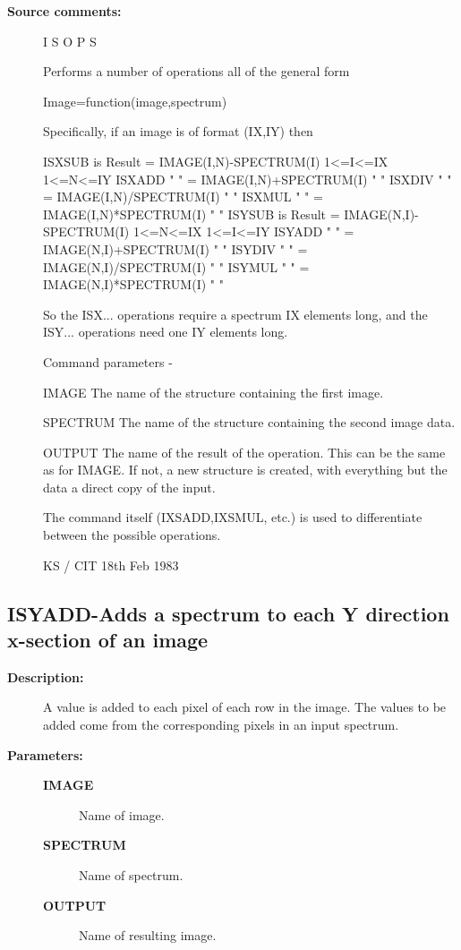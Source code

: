 \begin{description}
\begin{description}
\item [\textbf{Source comments:}]
\begin{terminalv}
 I S O P S

 Performs a number of operations all of the general form

 Image=function(image,spectrum)

 Specifically, if an image is of format (IX,IY) then

 ISXSUB is Result = IMAGE(I,N)-SPECTRUM(I) 1<=I<=IX 1<=N<=IY
 ISXADD  "   "    = IMAGE(I,N)+SPECTRUM(I)    "        "
 ISXDIV  "   "    = IMAGE(I,N)/SPECTRUM(I)    "        "
 ISXMUL  "   "    = IMAGE(I,N)*SPECTRUM(I)    "        "
 ISYSUB is Result = IMAGE(N,I)-SPECTRUM(I) 1<=N<=IX 1<=I<=IY
 ISYADD  "   "    = IMAGE(N,I)+SPECTRUM(I)    "        "
 ISYDIV  "   "    = IMAGE(N,I)/SPECTRUM(I)    "        "
 ISYMUL  "   "    = IMAGE(N,I)*SPECTRUM(I)    "        "

 So the ISX... operations require a spectrum IX elements long,
 and the ISY... operations need one IY elements long.

 Command parameters -

 IMAGE    The name of the structure containing the first image.

 SPECTRUM The name of the structure containing the second
          image data.

 OUTPUT   The name of the result of the operation.  This can
          be the same as for IMAGE.  If not, a new structure
          is created, with everything but the data a direct
          copy of the input.

 The command itself (IXSADD,IXSMUL, etc.) is used to
 differentiate between the possible operations.

                                  KS / CIT 18th Feb 1983
\end{terminalv}
\end{description}
\subsection{ISYADD-\label{ISYADD}Adds a spectrum to each Y direction x-section of an image}
\begin{description}

\item [\textbf{Description:}]
 A value is added to each pixel of each row in the image.
 The values to be added come from the corresponding pixels in
 an input spectrum.

\item [\textbf{Parameters:}]
\begin{description}
\item [\textbf{IMAGE}]
 Name of image.
\item [\textbf{SPECTRUM}]
 Name of spectrum.
\item [\textbf{OUTPUT}]
 Name of resulting image.
\end{description}


\end{description}
\end{description}
